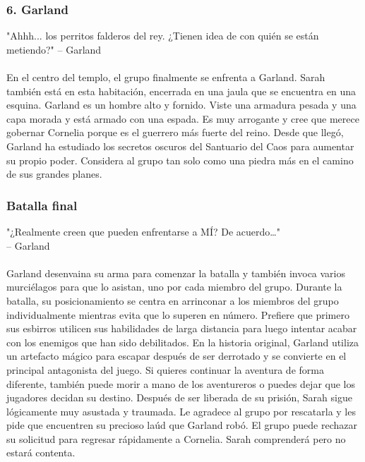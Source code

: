 \subsubsection*{6. Garland}
"Ahhh... los perritos falderos del rey. ¿Tienen idea de con quién se están metiendo?"
\indent -- Garland \\\\ 
En el centro del templo, el grupo finalmente se enfrenta a Garland. Sarah también está en esta habitación, encerrada en una jaula que se encuentra en una esquina. Garland es un hombre alto y fornido. Viste una armadura pesada y una capa morada y está armado con una espada. Es muy arrogante y cree que merece gobernar Cornelia porque es el guerrero más fuerte del reino. Desde que llegó, Garland ha estudiado los secretos oscuros del Santuario del Caos para aumentar su propio poder. Considera al grupo tan solo como una piedra más en el camino de sus grandes planes. \subsubsection*{Batalla final}
"¿Realmente creen que pueden enfrentarse a MÍ? De acuerdo…" \\
\indent -- Garland \\\\ 
Garland desenvaina su arma para comenzar la batalla y también invoca varios murciélagos para que lo asistan, uno por cada miembro del grupo. Durante la batalla, su posicionamiento se centra en arrinconar a los miembros del grupo individualmente mientras evita que lo superen en número. Prefiere que primero sus esbirros utilicen sus habilidades de larga distancia para luego intentar acabar con los enemigos que han sido debilitados. En la historia original, Garland utiliza un artefacto mágico para escapar después de ser derrotado y se convierte en el principal antagonista del juego. Si quieres continuar la aventura de forma diferente, también puede morir a mano de los aventureros o puedes dejar que los jugadores decidan su destino. Después de ser liberada de su prisión, Sarah sigue lógicamente muy asustada y traumada. Le agradece al grupo por rescatarla y les pide que encuentren su precioso laúd que Garland robó. El grupo puede rechazar su solicitud para regresar rápidamente a Cornelia. Sarah comprenderá pero no estará contenta.

\vfill

\vfill

\vspace{2.2cm}
\pagebreak

